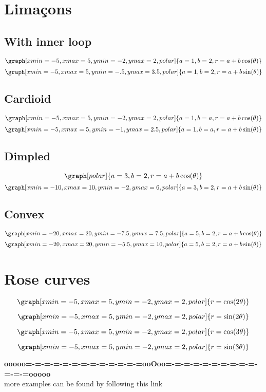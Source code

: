 \documentclass{ximera}
\begin{document}
\section{Lima\c{c}ons}

\subsection{With inner loop}
\[
\graph[xmin=-5,xmax=5,ymin=-2,ymax=2,polar]{a=1,b=2,r=a+b \cos(\theta)}
\]
\[
\graph[xmin=-5,xmax=5,ymin=-.5,ymax=3.5,polar]{a=1,b=2,r=a+b \sin(\theta)}
\]
\subsection{Cardioid}
\[
\graph[xmin=-5,xmax=5,ymin=-2,ymax=2,polar]{a=1,b=a,r=a+b \cos(\theta)}
\]
\[
\graph[xmin=-5,xmax=5,ymin=-1,ymax=2.5,polar]{a=1,b=a,r=a+b \sin(\theta)}
\]
\subsection{Dimpled}
\[
\graph[polar]{a=3,b=2,r=a+b \cos(\theta)}
\]
\[
\graph[xmin=-10,xmax=10,ymin=-2,ymax=6,polar]{a=3,b=2,r=a+b \sin(\theta)}
\]

\subsection{Convex}
\[
\graph[xmin=-20,xmax=20,ymin=-7.5,ymax=7.5,polar]{a=5,b=2,r=a+b \cos(\theta)}
\]
\[
\graph[xmin=-20,xmax=20,ymin=-5.5,ymax=10,polar]{a=5,b=2,r=a+b \sin(\theta)}
\]

\section{Rose curves}

\[
\graph[xmin=-5,xmax=5,ymin=-2,ymax=2,polar]{r=\cos(2\theta)}
\]

\[
\graph[xmin=-5,xmax=5,ymin=-2,ymax=2,polar]{r=\sin(2\theta)}
\]

\[
\graph[xmin=-5,xmax=5,ymin=-2,ymax=2,polar]{r=\cos(3\theta)}
\]

\[
\graph[xmin=-5,xmax=5,ymin=-2,ymax=2,polar]{r=\sin(3\theta)}
\]











\begin{center}
\textbf{\textcolor{green!50!black}{ooooo=-=-=-=-=-=-=-=-=-=-=-=-=ooOoo=-=-=-=-=-=-=-=-=-=-=-=-=ooooo}} \\

more examples can be found by following this link\\ 

\end{center}
\end{document}
